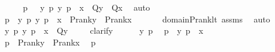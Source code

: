 \begin{isabellebody}
\ \ \isamarkupfalse%
\ \isamarkupfalse%
\ p{}\ {\isacharcolon}{\kern0pt}\ \ {\isachardoublequoteopen}{\isacharparenleft}{\kern0pt}{\isasymforall}y\ p{\isachardot}{\kern0pt}\ {\isasymlangle}y{\isacharcomma}{\kern0pt}\ p{\isasymrangle}\ {\isasymin}\ x\ {\isasymlongrightarrow}\ Q{\isacharparenleft}{\kern0pt}y{\isacharparenright}{\kern0pt}{\isacharparenright}{\kern0pt}\ {\isasymlongrightarrow}\ Q{\isacharparenleft}{\kern0pt}x{\isacharparenright}{\kern0pt}{\isachardoublequoteclose}\ \isamarkupfalse%
\ auto\ \isanewline
\ \ \isamarkupfalse%
\ p{}\ {\isacharcolon}{\kern0pt}\ {\isachardoublequoteopen}{\isasymforall}y\ p{\isachardot}{\kern0pt}\ {\isacharless}{\kern0pt}y{\isacharcomma}{\kern0pt}\ p{\isachargreater}{\kern0pt}\ {\isasymin}\ x\ {\isasymlongrightarrow}\ P{\isacharunderscore}{\kern0pt}rank{\isacharparenleft}{\kern0pt}y{\isacharparenright}{\kern0pt}\ {\isacharless}{\kern0pt}\ P{\isacharunderscore}{\kern0pt}rank{\isacharparenleft}{\kern0pt}x{\isacharparenright}{\kern0pt}{\isachardoublequoteclose}\ \isanewline
\ \ \ \ \isamarkupfalse%
\ domain{\isacharunderscore}{\kern0pt}P{\isacharunderscore}{\kern0pt}rank{\isacharunderscore}{\kern0pt}lt\ assms\ \isamarkupfalse%
\ auto\isanewline
\ \ \isanewline
\ \ \isamarkupfalse%
\ \isamarkupfalse%
\ {\isachardoublequoteopen}{\isasymforall}y\ p{\isachardot}{\kern0pt}\ {\isacharless}{\kern0pt}y{\isacharcomma}{\kern0pt}\ p{\isachargreater}{\kern0pt}\ {\isasymin}\ x\ {\isasymlongrightarrow}\ Q{\isacharparenleft}{\kern0pt}y{\isacharparenright}{\kern0pt}{\isachardoublequoteclose}\ \isanewline
\ \ \isamarkupfalse%
\ {\isacharparenleft}{\kern0pt}clarify{\isacharparenright}{\kern0pt}\isanewline
\ \ \ \ \isamarkupfalse%
\ y\ p\ \isamarkupfalse%
\ p{}{}\ {\isacharcolon}{\kern0pt}\ {\isachardoublequoteopen}{\isacharless}{\kern0pt}y{\isacharcomma}{\kern0pt}\ p{\isachargreater}{\kern0pt}\ {\isasymin}\ x{\isachardoublequoteclose}\isanewline
\ \ \ \ \isamarkupfalse%
\ \isamarkupfalse%
\ p{}\ {\isacharcolon}{\kern0pt}\ {\isachardoublequoteopen}P{\isacharunderscore}{\kern0pt}rank{\isacharparenleft}{\kern0pt}y{\isacharparenright}{\kern0pt}\ {\isacharless}{\kern0pt}\ P{\isacharunderscore}{\kern0pt}rank{\isacharparenleft}{\kern0pt}x{\isacharparenright}{\kern0pt}{\isachardoublequoteclose}\ \isamarkupfalse%
\ p{}\ \isamarkupfalse%

\end{isabellebody}
